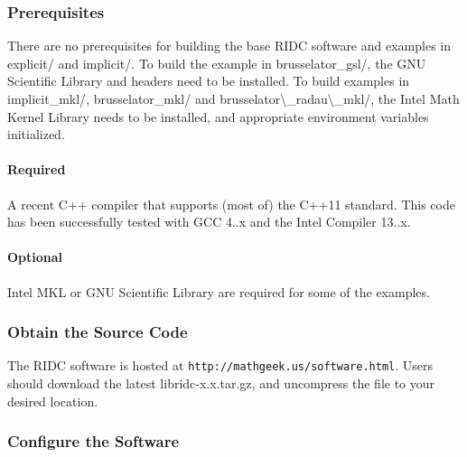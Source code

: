 \subsubsection*{Prerequisites}

There are no prerequisites for building the base R\+I\+D\+C software and examples in {\ttfamily explicit/} and {\ttfamily implicit/}. To build the example in {\ttfamily brusselator\+\_\+gsl/}, the G\+N\+U Scientific Library and headers need to be installed. To build examples in {\ttfamily implicit\+\_\+mkl/}, {\ttfamily brusselator\+\_\+mkl/} and {\ttfamily brusselator\textbackslash{}\+\_\+radau\textbackslash{}\+\_\+mkl/}, the Intel Math Kernel Library needs to be installed, and appropriate environment variables initialized.

\paragraph*{Required}


\begin{DoxyItemize}
\item A recent C++ compiler that supports (most of) the C++11 standard. This code has been successfully tested with G\+C\+C 4..\+x and the Intel Compiler 13..\+x.
\end{DoxyItemize}

\paragraph*{Optional}


\begin{DoxyItemize}
\item Intel M\+K\+L or G\+N\+U Scientific Library are required for some of the examples.
\end{DoxyItemize}

\subsubsection*{Obtain the Source Code}

The R\+I\+D\+C software is hosted at {\tt http\+://mathgeek.\+us/software.\+html}. Users should download the latest {\ttfamily libridc-\/x.\+x.\+tar.\+gz}, and uncompress the file to your desired location.

\subsubsection*{Configure the Software}

